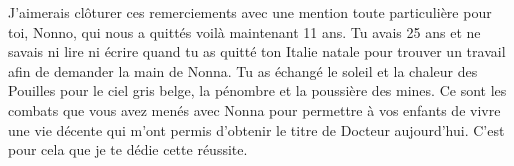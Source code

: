 \vspace{15pt}

J'aimerais clôturer ces remerciements avec une mention toute particulière pour toi, Nonno, qui nous a quittés voilà maintenant 11 ans. Tu avais 25 ans et ne savais ni lire ni écrire quand tu as quitté ton Italie natale pour trouver un travail afin de demander la main de Nonna. Tu as échangé le soleil et la chaleur des Pouilles pour le ciel gris belge, la pénombre et la poussière des mines. Ce sont les combats que vous avez menés avec Nonna pour permettre à vos enfants de vivre une vie décente qui m'ont permis d'obtenir le titre de Docteur aujourd'hui. C'est pour cela que je te dédie cette réussite. 
